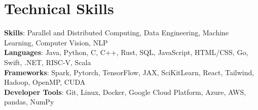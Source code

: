 \documentclass[letterpaper,11pt]{article}
\begin{document}
\section{Technical Skills}
 \begin{itemize}[leftmargin=0.15in, label={}, ]
    \small{\item{
    \textbf{Skills}{: Parallel and Distributed Computing, Data Engineering, Machine Learning, Computer Vision, NLP}\\
     \textbf{Languages}{: Java, Python, C, C++, Rust, SQL, JavaScript, HTML/CSS, Go, Swift, .NET, RISC-V, Scala} \\
     \textbf{Frameworks}{: Spark, Pytorch, TensorFlow, JAX, SciKitLearn, React, Tailwind, Hadoop, OpenMP, CUDA} \\
     \textbf{Developer Tools}{: Git, Linux, Docker, Google Cloud Platform, Azure, AWS, pandas, NumPy}
    }}
 \end{itemize}
\end{document}
